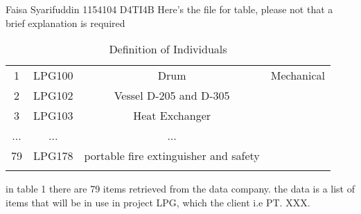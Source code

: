 Faisa Syarifuddin 1154104 D4TI4B
Here's the file for table, please not that a brief explanation is required

\begin{table}[h]
    \centering
    \begin{tabular}{cccc}
    \hline
    1 & LPG100 & Drum & Mechanical \\
    2 & LPG102 & Vessel D-205 and D-305 \\
    3 & LPG103 & Heat Exchanger \\
    ... & ... & ... \\
    79 & LPG178 & portable fire extinguisher and safety \\
         & 
    \hline
    \end{tabular}
    \caption{Definition of Individuals}
\end{table}

\par in table 1 there are 79 items retrieved from the data company. the data is a list of items that will be in use in project LPG, which the client i.e PT. XXX. 